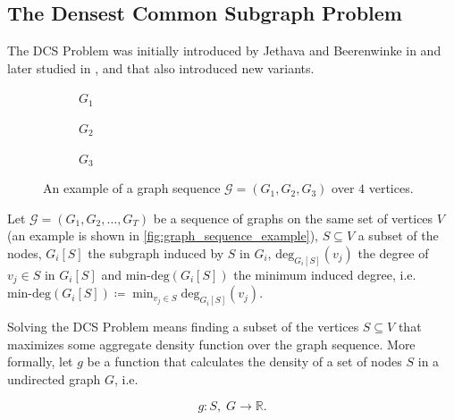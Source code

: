 \subsection{The Densest Common Subgraph Problem}%
\label{sub:the_common_densest_subgraph_problem}

The \acrfull{DCS} Problem was initially introduced by Jethava and Beerenwinke
in \cite{jethava2015finding}
and later studied in \cite{andersson2016finding}, \cite{charikar2018finding}
and \cite{semertzidis2019finding} that also introduced new variants.

\begin{figure}
	\begin{center}
		\begin{subfigure}[b]{0.3\textwidth}
			\centering
			\caption{$G_1$}
			\label{fig:graph_sequence_example1}
		\end{subfigure}
		\begin{subfigure}[b]{0.3\textwidth}
			\centering
			\caption{$G_2$}
			\label{fig:graph_sequence_example2}
		\end{subfigure}
		\begin{subfigure}[b]{0.3\textwidth}
			\centering
			\caption{$G_3$}
			\label{fig:graph_sequence_example3}
		\end{subfigure}
	\end{center}
	\caption[Example sequence graph]{An example of a graph sequence
		$\mathcal{G} = (G_1, G_2, G_3) $ over $4$ vertices.}
	\label{fig:graph_sequence_example}
\end{figure}

Let $\mathcal{G} = (G_1, G_2, \dots, G_T) $ be a sequence of graphs on the same
set of vertices $V$ (an example is shown in
\autoref{fig:graph_sequence_example}), $S \subseteq V$ a
subset of the nodes, $G_i[S]$ the subgraph induced by $S$ in $G_i$,
$\text{deg}_{G_i[S]} (v_{j} )$ the degree of $v_{j} \in S$ in $G_i[S]$ and
$\text{min-deg}(G_i[S])$ the minimum induced degree, i.e.
$\text{min-deg}(G_i[S]) \coloneqq \min _{v_{j}  \in S} \text{deg} _{G_i[S]}
	(v_{j}) $.

Solving the \acrlong{DCS} Problem means finding a subset
of the vertices $S \subseteq V$ that maximizes some aggregate density function
over the graph sequence. More formally, let $g$ be a
function that calculates the density of a set of nodes $S$ in a undirected
graph $G$, i.e.\

\begin{equation*}
	g: S, \; G \rightarrow \mathbb{R}.
\end{equation*}

